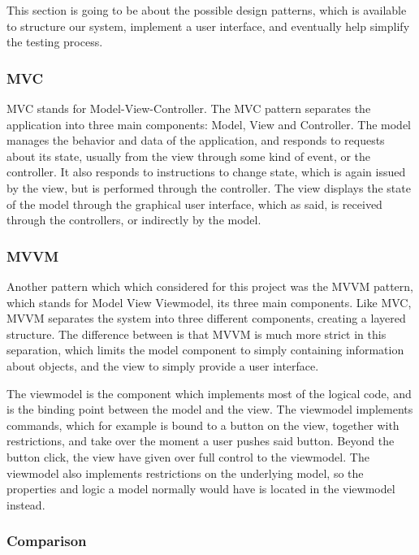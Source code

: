 This section is going to be about the possible design patterns, which is available to structure our system, implement a user interface, and eventually help simplify the testing process.

\subsubsection{MVC}

MVC stands for Model-View-Controller. The MVC pattern separates the application into three main components: Model, View and Controller. The model manages the behavior and data of the application, and responds to requests about its state, usually from the view through some kind of event, or the controller.  It also responds to instructions to change state, which is again issued by the view, but is performed through the controller. The view displays the state of the model through the graphical user interface, which as said, is received through the controllers, or indirectly by the model. \cite{Pattern1}

\subsubsection{MVVM}

Another pattern which which considered for this project was the MVVM pattern, which stands for Model View Viewmodel, its three main components. Like MVC, MVVM separates the system into three different components, creating a layered structure. The difference between is that MVVM is much more strict in this separation, which limits the model component to simply containing information about objects, and the view to simply provide a user interface. \cite{Pattern2}

The viewmodel is the component which implements most of the logical code, and is the binding point between the model and the view. The viewmodel implements commands, which for example is bound to a button on the view, together with restrictions, and take over the moment a user pushes said button. Beyond the button click, the view have given over full control to the viewmodel. The viewmodel also implements restrictions on the underlying model, so the properties and logic a model normally would have is located in the viewmodel instead. \cite{Pattern2}

\subsubsection{Comparison}

